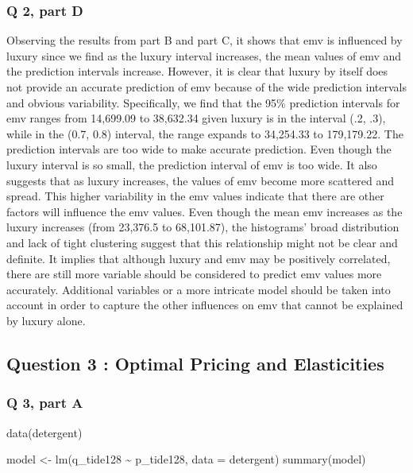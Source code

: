 \documentclass[
]{article}
\newenvironment{Shaded}{\begin{snugshade}}{\end{snugshade}}
\newcommand{\AttributeTok}[1]{\textcolor[rgb]{0.77,0.63,0.00}{#1}}
\newcommand{\FunctionTok}[1]{\textcolor[rgb]{0.00,0.00,0.00}{#1}}
\newcommand{\NormalTok}[1]{#1}
\newcommand{\OtherTok}[1]{\textcolor[rgb]{0.56,0.35,0.01}{#1}}
\newcommand{\SpecialCharTok}[1]{\textcolor[rgb]{0.00,0.00,0.00}{#1}}
\begin{document}
\hypertarget{q-2-part-d}{%
\subsubsection{Q 2, part D}\label{q-2-part-d}}

Observing the results from part B and part C, it shows that emv is
influenced by luxury since we find as the luxury interval increases, the
mean values of emv and the prediction intervals increase. However, it is
clear that luxury by itself does not provide an accurate prediction of
emv because of the wide prediction intervals and obvious variability.
Specifically, we find that the 95\% prediction intervals for emv ranges
from 14,699.09 to 38,632.34 given luxury is in the interval (.2, .3),
while in the (0.7, 0.8) interval, the range expands to 34,254.33 to
179,179.22. The prediction intervals are too wide to make accurate
prediction. Even though the luxury interval is so small, the prediction
interval of emv is too wide. It also suggests that as luxury increases,
the values of emv become more scattered and spread. This higher
variability in the emv values indicate that there are other factors will
influence the emv values. Even though the mean emv increases as the
luxury increases (from 23,376.5 to 68,101.87), the histograms' broad
distribution and lack of tight clustering suggest that this relationship
might not be clear and definite. It implies that although luxury and emv
may be positively correlated, there are still more variable should be
considered to predict emv values more accurately. Additional variables
or a more intricate model should be taken into account in order to
capture the other influences on emv that cannot be explained by luxury
alone.

\newpage

\hypertarget{question-3-optimal-pricing-and-elasticities}{%
\subsection{Question 3 : Optimal Pricing and
Elasticities}\label{question-3-optimal-pricing-and-elasticities}}

\hypertarget{q-3-part-a}{%
\subsubsection{Q 3, part A}\label{q-3-part-a}}

\begin{Shaded}
\begin{Highlighting}[]
\FunctionTok{data}\NormalTok{(detergent)}

\NormalTok{model }\OtherTok{\textless{}{-}} \FunctionTok{lm}\NormalTok{(q\_tide128 }\SpecialCharTok{\textasciitilde{}}\NormalTok{ p\_tide128, }\AttributeTok{data =}\NormalTok{ detergent)}
\FunctionTok{summary}\NormalTok{(model)}
\end{Highlighting}
\end{Shaded}
\end{document}
